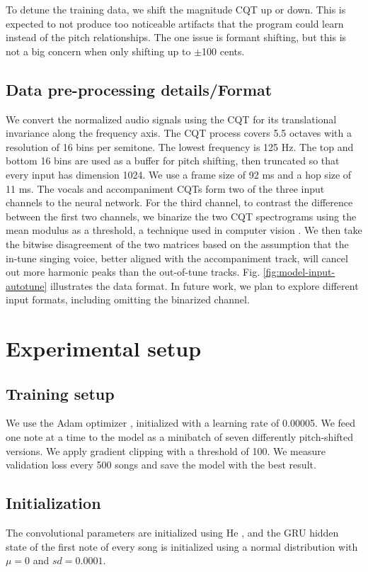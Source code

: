 To detune the training data, we shift the magnitude CQT up or down. This is expected to not produce too noticeable artifacts that the program could learn instead of the pitch relationships. The one issue is formant shifting, but this is not a big concern when only shifting up to $\pm$100 cents. 
\subsection{Data pre-processing details/Format}
\label{sec:data-format-autotune}
We convert the normalized audio signals using the CQT for its translational invariance along the frequency axis. The CQT process covers 5.5 octaves with a resolution of 16 bins per semitone. The lowest frequency is 125 Hz. The top and bottom 16 bins are used as a buffer for pitch shifting, then truncated so that every input has dimension 1024. We use a frame size of 92 ms and a hop size of 11 ms. The vocals and accompaniment CQTs form two of the three input channels to the neural network. For the third channel, to contrast the difference between the first two channels, we binarize the two CQT spectrograms using the mean modulus as a threshold, a technique used in computer vision \cite{sezgin2004survey}. We then take the bitwise disagreement of the two matrices based on the assumption that the in-tune singing voice, better aligned with the accompaniment track, will cancel out more harmonic peaks than the out-of-tune tracks. Fig. \ref{fig:model-input-autotune} illustrates the data format. In future work, we plan to explore different input formats, including omitting the binarized channel.


\section{Experimental setup}
\label{sec:experiments-autotune}
\subsection{Training setup}
We use the Adam optimizer \cite{kingma2014adam}, initialized with a learning rate of 0.00005. We feed one note at a time to the model as a minibatch of seven differently pitch-shifted versions. We apply gradient clipping \cite{pascanu2013difficulty} with a threshold of 100. We measure validation loss every 500 songs and save the model with the best result. 
\subsection{Initialization}
The convolutional parameters are initialized using He \cite{he2015delving}, and the GRU hidden state of the first note of every song is initialized using a normal distribution with $\mu=0$ and $sd=0.0001$.
